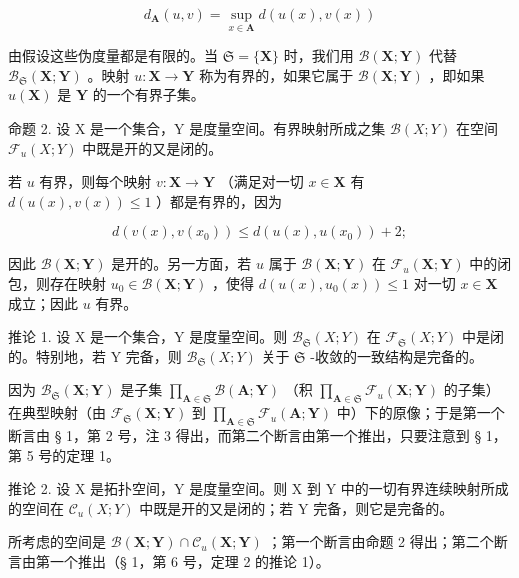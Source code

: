 \[
d _ {\mathbf {A}} (u, v) = \sup _ {x \in \mathbf {A}} d (u (x), v (x))\tag{A ∈ S}
\]

由假设这些伪度量都是有限的。当 \(\mathfrak{S} = \{\mathbf{X}\}\) 时，我们用 \(\mathcal{B}(\mathbf{X};\mathbf{Y})\) 代替 \(\mathcal{B}_{\mathfrak{S}}(\mathbf{X};\mathbf{Y})\) 。映射 \(u:\mathbf{X}\to \mathbf{Y}\) 称为有界的，如果它属于 \(\mathcal{B}(\mathbf{X};\mathbf{Y})\) ，即如果 \(u(\mathbf{X})\) 是 \(\mathbf{Y}\) 的一个有界子集。

命题 2. 设 X 是一个集合，Y 是度量空间。有界映射所成之集 \(\mathcal{B}(X;Y)\) 在空间 \(\mathcal{F}_{u}(X;Y)\) 中既是开的又是闭的。

若 \(u\) 有界，则每个映射 \(v: \mathbf{X} \to \mathbf{Y}\) （满足对一切 \(x \in \mathbf{X}\) 有 \(d(u(x), v(x)) \leqslant 1\) ）都是有界的，因为

\[
d (v (x), v (x _ {0})) \leqslant d (u (x), u (x _ {0})) + 2;
\]

因此 \(\mathcal{B}(\mathbf{X};\mathbf{Y})\) 是开的。另一方面，若 \(u\) 属于 \(\mathcal{B}(\mathbf{X};\mathbf{Y})\) 在 \(\mathcal{F}_u(\mathbf{X};\mathbf{Y})\) 中的闭包，则存在映射 \(u_0\in \mathcal{B}(\mathbf{X};\mathbf{Y})\) ，使得 \(d(u(x),u_0(x))\leqslant 1\) 对一切 \(x\in \mathbf{X}\) 成立；因此 \(u\) 有界。

推论 1. 设 X 是一个集合，Y 是度量空间。则 \(\mathcal{B}_{\mathfrak{S}}(X;Y)\) 在 \(\mathcal{F}_{\mathfrak{S}}(X;Y)\) 中是闭的。特别地，若 Y 完备，则 \(\mathcal{B}_{\mathfrak{S}}(X;Y)\) 关于 \(\mathfrak{S}\) -收敛的一致结构是完备的。

因为 \(\mathcal{B}_{\mathfrak{S}}(\mathbf{X};\mathbf{Y})\) 是子集 \(\prod_{\mathbf{A}\in \mathfrak{S}}\mathcal{B}(\mathbf{A};\mathbf{Y})\) （积 \(\prod_{\mathbf{A}\in \mathfrak{S}}\mathcal{F}_u(\mathbf{X};\mathbf{Y})\) 的子集）在典型映射（由 \(\mathcal{F}_{\mathfrak{S}}(\mathbf{X};\mathbf{Y})\) 到 \(\prod_{\mathbf{A}\in \mathfrak{S}}\mathcal{F}_u(\mathbf{A};\mathbf{Y})\) 中）下的原像；于是第一个断言由 § 1，第 2 号，注 3 得出，而第二个断言由第一个推出，只要注意到 § 1，第 5 号的定理 1。

推论 2. 设 X 是拓扑空间，Y 是度量空间。则 X 到 Y 中的一切有界连续映射所成的空间在 \(\mathcal{C}_u(X;Y)\) 中既是开的又是闭的；若 Y 完备，则它是完备的。

所考虑的空间是 \(\mathcal{B}(\mathbf{X};\mathbf{Y})\cap \mathcal{C}_u(\mathbf{X};\mathbf{Y})\) ；第一个断言由命题 2 得出；第二个断言由第一个推出（§ 1，第 6 号，定理 2 的推论 1）。

